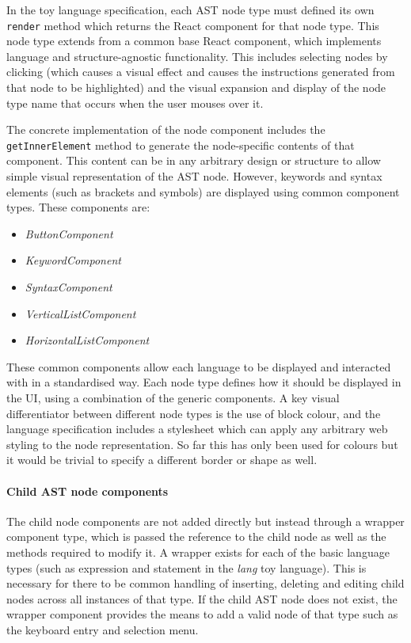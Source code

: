 In the toy language specification, each AST node type must defined its own \verb+render+ method which returns the React component for that node type. This node type extends from a common base React component, which implements language and structure-agnostic functionality. This includes selecting nodes by clicking (which causes a visual effect and causes the instructions generated from that node to be highlighted) and the visual expansion and display of the node type name that occurs when the user mouses over it.

The concrete implementation of the node component includes the \verb+getInnerElement+ method to generate the node-specific contents of that component. This content can be in any arbitrary design or structure to allow simple visual representation of the AST node. However, keywords and syntax elements (such as brackets and symbols) are displayed using common component types. These components are:
\begin{itemize}
\item \textit{ButtonComponent}
\item \textit{KeywordComponent}
\item \textit{SyntaxComponent}
\item \textit{VerticalListComponent}
\item \textit{HorizontalListComponent}
\end{itemize}
These common components allow each language to be displayed and interacted with in a standardised way. Each node type defines how it should be displayed in the UI, using a combination of the generic components. A key visual differentiator between different node types is the use of block colour, and the language specification includes a stylesheet which can apply any arbitrary web styling to the node representation. So far this has only been used for colours but it would be trivial to specify a different border or shape as well.

\paragraph{Child AST node components}
The child node components are not added directly but instead through a wrapper component type, which is passed the reference to the child node as well as the methods required to modify it. A wrapper exists for each of the basic language types (such as expression and statement in the \textit{lang} toy language). This is necessary for there to be common handling of inserting, deleting and editing child nodes across all instances of that type. If the child AST node does not exist, the wrapper component provides the means to add a valid node of that type such as the keyboard entry and selection menu.

